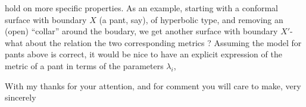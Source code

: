hold on more specific properties. As an example, starting with a  conformal surface with boundary $X$ (a pant, say), of hyperbolic type, and removing an (open) ``collar'' around the boudary, we get another surface with boundary $X'$- what about the relation  the two corresponding metrics ? Assuming the model for pants above is correct, it would be nice to have an explicit expression of the metric of a pant in terms of the parameters $\lambda_i$,

With my thanks for your attention, and for  comment you will care to make, very sincerely 
